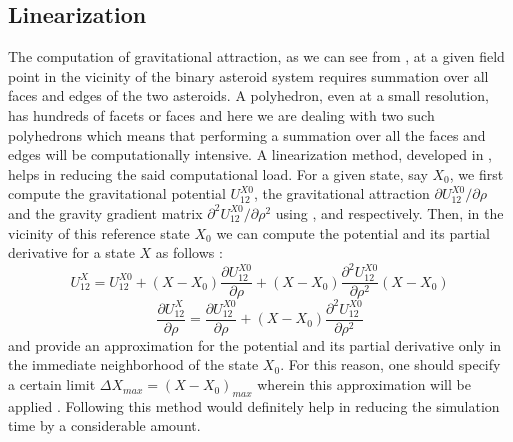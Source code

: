 \subsection{Linearization}
\label{grav_lin}
The computation of gravitational attraction, as we can see from , at a given field point in the vicinity of the binary asteroid system requires summation over all faces and edges of the two asteroids. A polyhedron, even at a small resolution, has hundreds of facets or faces and here we are dealing with two such polyhedrons which means that performing a summation over all the faces and edges will be computationally intensive. A linearization method, developed in \cite{stefaan_thesis}, helps in reducing the said computational load. For a given state, say $X_0$, we first compute the gravitational potential $U_{12}^{X0}$, the gravitational attraction $\partial U_{12}^{X0}/ \partial \rho$ and the gravity gradient matrix $\partial^2 U_{12}^{X0}/ \partial \rho^2$ using ,  and  respectively. Then, in the vicinity of this reference state $X_0$ we can compute the potential and its partial derivative for a state $X$ as follows \cite{stefaan_thesis}:
\begin{equation}
\label{u12_lin}
U_{12}^X = U_{12}^{X0} + (X - X_0) \frac{\partial U_{12}^{X0}}{\partial \rho} + (X - X_0)\frac{\partial^2 U_{12}^{X0}}{\partial \rho^2} (X - X_0)
\end{equation}
%
\begin{equation}
\label{u12_diff_lin}
\frac{\partial U_{12}^X}{\partial \rho} = \frac{\partial U_{12}^{X0}}{\partial \rho} + (X - X_0)\frac{\partial^2 U_{12}^{X0}}{\partial \rho^2}
\end{equation}
%
 and  provide an approximation for the potential and its partial derivative only in the immediate neighborhood of the state $X_0$. For this reason, one should specify a certain limit $\Delta X_{max} = (X - X_0)_{max}$ wherein this approximation will be applied \cite{stefaan_thesis}. Following this method would definitely help in reducing the simulation time by a considerable amount.

